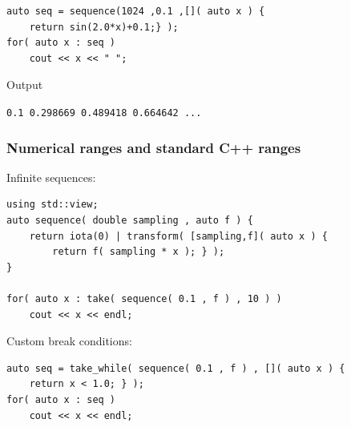 \documentclass{beamer}
\newcommand{\rem}[1]{}
\newcommand{\heading}[1]{\frametitle{#1}}
\begin{document}
\begin{frame}[fragile]
\begin{onlyenv}
\begin{lstlisting}[basicstyle=\scriptsize\ttfamily]
auto seq = sequence(1024 ,0.1 ,[]( auto x ) {
    return sin(2.0*x)+0.1;} );
for( auto x : seq )
    cout << x << " ";
\end{lstlisting}
\vspace{2ex}Output

\vspace{0.5ex}\lstinline$0.1 0.298669 0.489418 0.664642 ...$
 \end{onlyenv}
 \rem{
 \begin{onlyenv}<5>
  More complicated sequence
\begin{lstlisting}[basicstyle=\scriptsize\ttfamily]
auto sequence2( int n , double sampling , auto f )
{
    auto seq = boost::counting_range( 0 , n );
    return seq | transformed( [sampling,f]( auto i ) {
            double x = sampling*static_cast<double>( i );
            return std::make_tuple(x,f(x)); } );

}

auto seq = sequence2( n , 0.1 , []( auto x ) {
    return sin( 2.0 * x ) + 0.1; } );
for( auto x : zseq )
    cout << "(" << std::get< 0 >( x ) << ","
         << std::get< 1 >( x ) << ") ";
\end{lstlisting}
\vspace{2ex}Output

\vspace{0.5ex}\lstinline$(0,0.1) (0.1,0.298669) (0.2,0.489418) ...$
 \end{onlyenv}
 }
\end{frame}

\begin{frame}[fragile]
  \heading{Numerical ranges and standard C++ ranges}
  
  Infinite sequences:
  
  \begin{lstlisting}[basicstyle=\scriptsize\ttfamily]
using std::view;
auto sequence( double sampling , auto f ) {
    return iota(0) | transform( [sampling,f]( auto x ) {
        return f( sampling * x ); } );
}

for( auto x : take( sequence( 0.1 , f ) , 10 ) )
    cout << x << endl;
  \end{lstlisting}
  
  \vspace{2ex}
  Custom break conditions:
  \begin{lstlisting}[basicstyle=\scriptsize\ttfamily]
auto seq = take_while( sequence( 0.1 , f ) , []( auto x ) {
    return x < 1.0; } );
for( auto x : seq )
    cout << x << endl;
  \end{lstlisting}
  
\end{frame}
\end{document}
